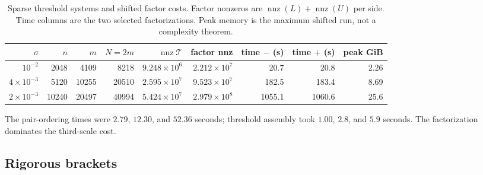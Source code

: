\documentclass[11pt]{article}
\theoremstyle{definition}
\theoremstyle{remark}
\newcommand{\Tmat}{\mathcal T}
\begin{document}
\begin{table}[H]
\centering
\caption{Sparse threshold systems and shifted factor costs.  Factor nonzeros
are $\operatorname{nnz}(L)+\operatorname{nnz}(U)$ per side.  Time columns
are the two selected factorizations.  Peak memory is the maximum shifted
run, not a complexity theorem.}
\label{tab:cost}
\scriptsize
\begin{tabular}{rrrrrrrrr}
\toprule
$\sigma$ & $n$ & $m$ & $N=2m$ & $\operatorname{nnz}\Tmat$
& factor nnz & time $-$ (s) & time $+$ (s) & peak GiB\\
\midrule
$10^{-2}$ & 2048 & 4109 & 8218 & $9.248\times10^6$
& $2.212\times10^7$ & 20.7 & 20.8 & 2.26\\
$4\times10^{-3}$ & 5120 & 10255 & 20510 & $2.595\times10^7$
& $9.523\times10^7$ & 182.5 & 183.4 & 8.69\\
$2\times10^{-3}$ & 10240 & 20497 & 40994 & $5.424\times10^7$
& $2.979\times10^8$ & 1055.1 & 1060.6 & 25.6\\
\bottomrule
\end{tabular}
\end{table}

The pair-ordering times were $2.79$, $12.30$, and $52.36$ seconds; threshold
assembly took $1.00$, $2.8$, and $5.9$ seconds.  The factorization dominates
the third-scale cost.

\subsection{Rigorous brackets}

\begin{table}[H]
\centering
\caption{Exact-target inertia certificates under the uniform
$\gamma_{24N+64}$ model.  Here $\eta_T$ includes channel enclosure and
threshold formation, while $\varepsilon_\pm$ additionally include shifted
assembly, sparse-LU backward error, and $LDL^*$ conversion.}
\label{tab:certificates}
\scriptsize
{}
\end{table}
\end{document}
